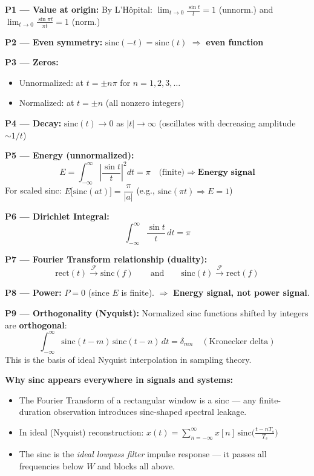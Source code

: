 \documentclass[10pt,a4paper]{article}
\newcommand{\Int}{\displaystyle\int_{-\infty}^{\infty}}
\begin{document}
\begin{propbox}
\textbf{P1 --- Value at origin:} By L'Hôpital: $\lim_{t\to0}\frac{\sin t}{t}=1$ (unnorm.) and $\lim_{t\to0}\frac{\sin\pi t}{\pi t}=1$ (norm.)

\medskip
\textbf{P2 --- Even symmetry:} $\text{sinc}(-t) = \text{sinc}(t)$ $\Rightarrow$ \textbf{even function}

\medskip
\textbf{P3 --- Zeros:}
\begin{itemize}
  \item Unnormalized: at $t = \pm n\pi$ for $n = 1, 2, 3, \ldots$
  \item Normalized: at $t = \pm n$ (all nonzero integers)
\end{itemize}

\medskip
\textbf{P4 --- Decay:} $\text{sinc}(t) \to 0$ as $|t| \to \infty$ (oscillates with decreasing amplitude $\sim 1/t$)

\medskip
\textbf{P5 --- Energy (unnormalized):}
\[
  E = \Int \left|\frac{\sin t}{t}\right|^2 dt = \pi \quad\text{(finite)} \Rightarrow \textbf{Energy signal}
\]
For scaled sinc: $E\bigl[\text{sinc}(at)\bigr] = \dfrac{\pi}{|a|}$ \quad (e.g., $\text{sinc}(\pi t) \Rightarrow E = 1$)

\medskip
\textbf{P6 --- Dirichlet Integral:}
\[
  \Int \frac{\sin t}{t}\,dt = \pi
\]

\medskip
\textbf{P7 --- Fourier Transform relationship (duality):}
\[
  \text{rect}(t) \xrightarrow{\mathcal{F}} \text{sinc}(f) \qquad\text{and}\qquad \text{sinc}(t) \xrightarrow{\mathcal{F}} \text{rect}(f)
\]

\medskip
\textbf{P8 --- Power:} $P = 0$ (since $E$ is finite). $\Rightarrow$ \textbf{Energy signal, not power signal}.

\medskip
\textbf{P9 --- Orthogonality (Nyquist):} Normalized sinc functions shifted by integers are \textbf{orthogonal}:
\[
  \Int \text{sinc}(t-m)\,\text{sinc}(t-n)\,dt = \delta_{mn} \quad (\text{Kronecker delta})
\]
This is the basis of ideal Nyquist interpolation in sampling theory.
\end{propbox}

\begin{notebox}
\textbf{Why sinc appears everywhere in signals and systems:}
\begin{itemize}
  \item The Fourier Transform of a rectangular window is a sinc --- any finite-duration observation introduces sinc-shaped spectral leakage.
  \item In ideal (Nyquist) reconstruction: $x(t) = \sum_{n=-\infty}^{\infty} x[n]\,\text{sinc}\!\bigl(\tfrac{t-nT_s}{T_s}\bigr)$
  \item The sinc is the \emph{ideal lowpass filter} impulse response --- it passes all frequencies below $W$ and blocks all above.
\end{itemize}
\end{notebox}
\end{document}
